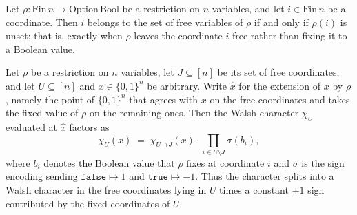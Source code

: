 \begin{definition}
\label{RestrictionFourier.mem_freeVars}
\leanok
{}
Let $\rho : \mathrm{Fin}\,n \to \mathrm{Option}\,\mathrm{Bool}$ be a restriction on $n$
variables, and let $i \in \mathrm{Fin}\,n$ be a coordinate. Then $i$ belongs to the set
of free variables of $\rho$ if and only if $\rho(i)$ is unset; that is, exactly when
$\rho$ leaves the coordinate $i$ free rather than fixing it to a Boolean value.
\end{definition}

\begin{lemma}
\label{RestrictionFourier.chiS_extend}
\leanok
{}
Let $\rho$ be a restriction on $n$ variables, let $J\subseteq[n]$ be its set of free
coordinates, and let $U\subseteq[n]$ and $x\in\{0,1\}^n$ be arbitrary. Write $\hat x$
for the extension of $x$ by $\rho$, namely the point of $\{0,1\}^n$ that agrees with $x$
on the free coordinates and takes the fixed value of $\rho$ on the remaining ones. Then
the Walsh character $\chi_U$ evaluated at $\hat x$ factors as
\[
  \chi_U(\hat x) \;=\; \chi_{U\cap J}(x)\cdot\prod_{i\in U\setminus J}\sigma(b_i),
\]
where $b_i$ denotes the Boolean value that $\rho$ fixes at coordinate $i$ and $\sigma$
is the sign encoding sending $\mathtt{false}\mapsto 1$ and $\mathtt{true}\mapsto -1$.
Thus the character splits into a Walsh character in the free coordinates lying in $U$
times a constant $\pm1$ sign contributed by the fixed coordinates of $U$.
\end{lemma}

